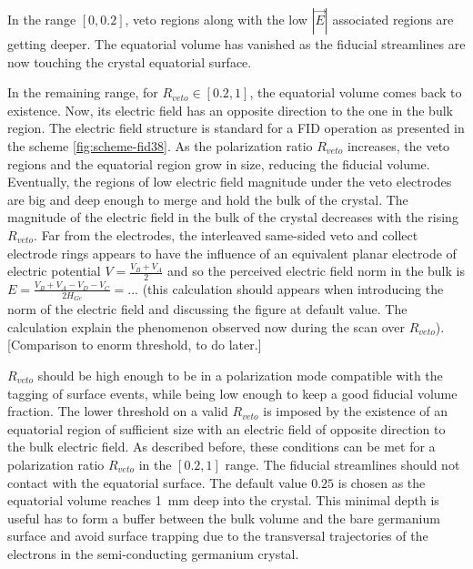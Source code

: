 In the range $[0, 0.2]$, veto regions along with the low $|\vec{E}|$ associated regions are getting deeper. The equatorial volume has vanished as the fiducial streamlines are now touching the crystal equatorial surface. 

In the remaining range, for $R_{veto} \in [0.2, 1]$, the equatorial volume comes back to existence. Now, its electric field has an opposite direction to the one in the bulk region. The electric field structure is standard for a FID operation as presented in the scheme \ref{fig:scheme-fid38}. As the polarization ratio $R_{veto}$ increases, the veto regions and the equatorial region grow in size, reducing the fiducial volume. Eventually, the regions of low electric field magnitude under the veto electrodes are big and deep enough to merge and hold the bulk of the crystal.
The magnitude of the electric field in the bulk of the crystal decreases with the rising $R_{veto}$. Far from the electrodes, the interleaved same-sided veto and collect electrode rings appears to have the influence of an equivalent planar electrode of electric potential $V=\frac{V_B + V_A}{2}$ and so the perceived electric field norm in the bulk is $E = \frac{V_B + V_A - V_D - V_C}{2 H_{Ge}}=...$ (this calculation should appears when introducing the norm of the electric field and discussing the figure at default value. The calculation explain the phenomenon observed now during the scan over $R_{veto}$).
{\color{red} [Comparison to enorm threshold, to do later.]}

$R_{veto}$ should be high enough to be in a polarization mode compatible with the tagging of surface events, while being low enough to keep a good fiducial volume fraction. The lower threshold on a valid $R_{veto}$ is imposed by the existence of an equatorial region of sufficient size with an electric field of opposite direction to the bulk electric field. As described before, these conditions can be met for a polarization ratio $R_{veto}$ in the $[0.2, 1]$ range. The fiducial streamlines should not contact with the equatorial surface. The default value $0.25$ is chosen as the equatorial volume reaches \SI{1}{\mm} deep into the crystal. This minimal depth is useful has to form a buffer between the bulk volume and the bare germanium surface and avoid surface trapping due to the transversal trajectories of the electrons in the semi-conducting germanium crystal.

